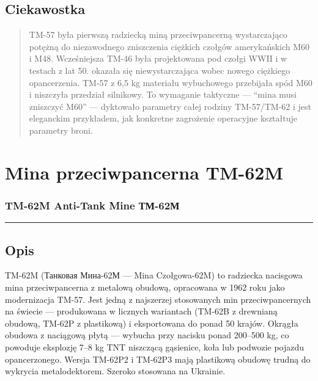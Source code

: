 \documentclass[12pt,openany,oneside]{book}
\begin{document}
\section{Ciekawostka}\label{ciekawostka-114}

\begin{quote}
TM-57 była pierwszą radziecką miną przeciwpancerną wystarczająco potężną
do niezawodnego zniszczenia ciężkich czołgów amerykańskich M60 i M48.
Wcześniejsza TM-46 była projektowana pod czołgi WWII i w testach z lat
50. okazała się niewystarczająca wobec nowego ciężkiego opancerzenia.
TM-57 z 6,5 kg materiału wybuchowego przebijała spód M60 i niszczyła
przedział silnikowy. To wymaganie taktyczne --- ``mina musi zniszczyć
M60'' --- dyktowało parametry całej rodziny TM-57/TM-62 i jest
eleganckim przykładem, jak konkretne zagrożenie operacyjne kształtuje
parametry broni.
\end{quote}

\chapter{Mina przeciwpancerna TM-62M}\label{mina-przeciwpancerna-tm-62m}

\subsection{TM-62M Anti-Tank Mine \textbar{}
ТМ-62М}\label{tm-62m-anti-tank-mine-ux442ux43c-62ux43c}

\begin{center}\rule{0.5\linewidth}{0.5pt}\end{center}

\section{Opis}\label{opis-115}

TM-62M (Танковая Мина-62М --- Mina Czołgowa-62M) to radziecka nacisgowa
mina przeciwpancerna z metalową obudową, opracowana w 1962 roku jako
modernizacja TM-57. Jest jedną z najszerzej stosowanych min
przeciwpancernych na świecie --- produkowana w licznych wariantach
(TM-62B z drewnianą obudową, TM-62P z plastikową) i eksportowana do
ponad 50 krajów. Okrągła obudowa z naciągową płytą --- wybucha przy
nacisku ponad 200--500 kg, co powoduje eksplozję 7--8 kg TNT niszczącą
gąsienice, koła lub podwozie pojazdu opancerzonego. Wersja TM-62P2 i
TM-62P3 mają plastikową obudowę trudną do wykrycia metalodektorem.
Szeroko stosowana na Ukrainie.
\end{document}
